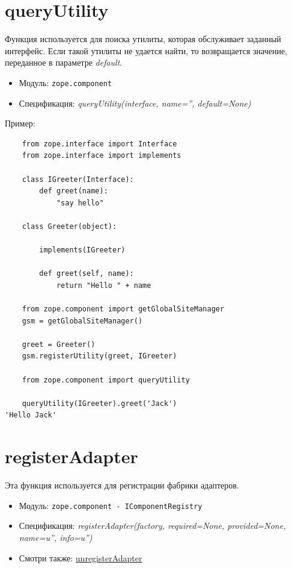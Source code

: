 \documentclass[a4paper,openany,twoside,draft]{book}
\providecommand*{\DUroletitlereference}[1]{\textsl{#1}}
\begin{document}
\section*{queryUtility%
  \label{queryutility}%
}

Функция используется для поиска утилиты, которая обслуживает заданный интерфейс.  Если такой утилиты не удается найти, то возвращается значение, переданное в параметре \DUroletitlereference{default}.

\begin{itemize}

\item Модуль: \texttt{zope.component}

\item Спецификация: \DUroletitlereference{queryUtility(interface, name='', default=None)}

\end{itemize}

Пример:

\begin{verbatim}
    from zope.interface import Interface
    from zope.interface import implements

    class IGreeter(Interface):
        def greet(name):
            "say hello"

    class Greeter(object):

        implements(IGreeter)

        def greet(self, name):
            return "Hello " + name

    from zope.component import getGlobalSiteManager
    gsm = getGlobalSiteManager()

    greet = Greeter()
    gsm.registerUtility(greet, IGreeter)

    from zope.component import queryUtility

    queryUtility(IGreeter).greet('Jack')
'Hello Jack'
\end{verbatim}


\section*{registerAdapter%
  \label{registeradapter}%
}

Эта функция используется для регистрации фабрики адаптеров.

\begin{itemize}

\item Модуль: \texttt{zope.component - IComponentRegistry}

\item Спецификация: \DUroletitlereference{registerAdapter(factory, required=None, provided=None, name=u'', info=u'')}

\item Смотри также: \hyperref[unregisteradapter]{unregisterAdapter}

\end{itemize}
\end{document}
